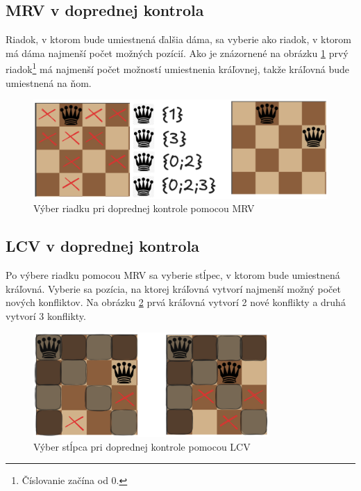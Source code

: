 \subsection{MRV v doprednej kontrola}
Riadok, v ktorom bude umiestnená ďalšia dáma, sa vyberie ako riadok, v ktorom má dáma najmenší počet možných pozícií. Ako je znázornené na obrázku \ref{fig:forward-checking-mrv} prvý riadok\footnote{Číslovanie začína od 0.} má najmenší počet možností umiestnenia kráľovnej, takže kráľovná bude umiestnená na ňom.
\begin{figure}
    \centering
    \includegraphics[width=1\textwidth]{figs/forward-checking/forward-checking-mrv}
    \caption{Výber riadku pri doprednej kontrole pomocou MRV}
    \label{fig:forward-checking-mrv}
\end{figure}

\subsection{LCV v doprednej kontrola}
Po výbere riadku pomocou MRV sa vyberie stĺpec, v ktorom bude umiestnená kráľovná. Vyberie sa pozícia, na ktorej kráľovná vytvorí najmenší možný počet nových konfliktov. Na obrázku \ref{fig:forward-checking-lcv} prvá kráľovná vytvorí 2 nové konflikty a druhá vytvorí 3 konflikty.
\begin{figure}
    \centering
    \includegraphics[width=0.8\textwidth]{figs/forward-checking/forward-checking-lcv}
    \caption{Výber stĺpca pri doprednej kontrole pomocou LCV}
    \label{fig:forward-checking-lcv}
\end{figure}
